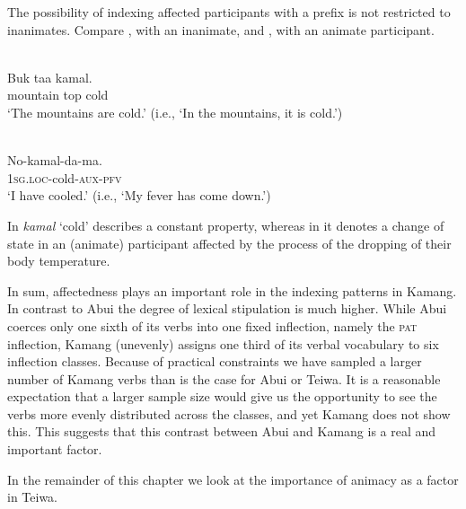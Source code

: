   The possibility of indexing affected participants with a prefix is not restricted to inanimates. Compare , with an inanimate, and , with an animate participant.


\ea%
\label{bkm:Ref384657017}
 \\ 
\gll   Buk  taa  kamal.   \\  
    mountain  top  cold    \\
\glt `The mountains are cold.' (i.e., `In the mountains, it is cold.')
\z



\ea%
\label{bkm:Ref384657025}
 \\ 
\gll    No-kamal-da-ma.     \\  
    1\textsc{sg}.\textsc{loc}{}-cold-\textsc{aux-pfv}   \\
\glt  `I have cooled.' (i.e., `My fever has come down.')
\z



In  \textit{kamal} `cold' describes a constant property, whereas in  it denotes a change of state in an (animate) participant affected by the process of the dropping of their body temperature.

In sum, affectedness plays an important role in the indexing patterns in Kamang. In contrast to Abui the degree of lexical stipulation is much higher. While Abui coerces only one sixth of its verbs into one fixed inflection, namely the \textsc{pat} inflection, Kamang (unevenly) assigns one third of its verbal vocabulary to six inflection classes. Because of practical constraints we have sampled a larger number of Kamang verbs than is the case for Abui or Teiwa. It is a reasonable expectation that a larger sample size would give us the opportunity to see the verbs more evenly distributed across the classes, and yet Kamang does not show this. This suggests that this contrast between Abui and Kamang is a real and important factor.

In the remainder of this chapter we look at the importance of animacy as a factor in Teiwa.

